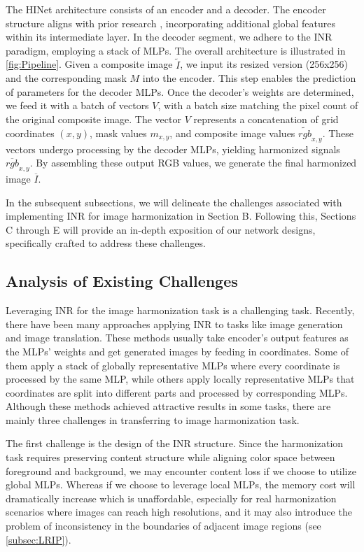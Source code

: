 \documentclass[10pt,journal,twocolumn,twoside]{IEEEtran}
\begin{document}
The HINet architecture consists of an encoder and a decoder. The encoder structure aligns with prior research \cite{sofiiuk2021foreground, xue2022dccf}, incorporating additional global features within its intermediate layer. In the decoder segment, we adhere to the INR paradigm, employing a stack of MLPs. The overall architecture is illustrated in \cref{fig:Pipeline}. Given a composite image $\widetilde{I}$, we input its resized version (256x256) and the corresponding mask $M$ into the encoder. This step enables the prediction of parameters for the decoder MLPs. Once the decoder's weights are determined, we feed it with a batch of vectors $V$, with a batch size matching the pixel count of the original composite image. The vector $V$ represents a concatenation of grid coordinates $(x, y)$, mask values $m_{x, y}$, and composite image values $\widetilde{rgb}_{x, y}$. These vectors undergo processing by the decoder MLPs, yielding harmonized signals $\overline{rgb}_{x, y}$. By assembling these output RGB values, we generate the final harmonized image $\overline{I}$.

In the subsequent subsections, we will delineate the challenges associated with implementing INR for image harmonization in Section B. Following this, Sections C through E will provide an in-depth exposition of our network designs, specifically crafted to address these challenges.

\subsection{Analysis of Existing Challenges}
\label{subsec:analysis}

Leveraging INR for the image harmonization task is a challenging task. Recently, there have been many approaches\cite{anokhin2021image, skorokhodov2021adversarial, karras2021alias, shaham2021spatially} applying INR to tasks like image generation and image translation. These methods usually take encoder's output features as the MLPs' weights and get generated images by feeding in coordinates. Some of them apply a stack of globally representative MLPs \cite{anokhin2021image} where every coordinate is processed by the same MLP, while others apply locally representative MLPs\cite{shaham2021spatially} that coordinates are split into different parts and processed by corresponding MLPs. Although these methods achieved attractive results in some tasks, there are mainly three challenges in transferring to image harmonization task.

The first challenge is the design of the INR structure. Since the harmonization task requires preserving content structure while aligning color space between foreground and background, we may encounter content loss \cite{shaham2021spatially} if we choose to utilize global MLPs. Whereas if we choose to leverage local MLPs, the memory cost will dramatically increase which is unaffordable, especially for real harmonization scenarios where images can reach high resolutions, and it may also introduce the problem of inconsistency in the boundaries of adjacent image regions (see \cref{subsec:LRIP}).
\end{document}

